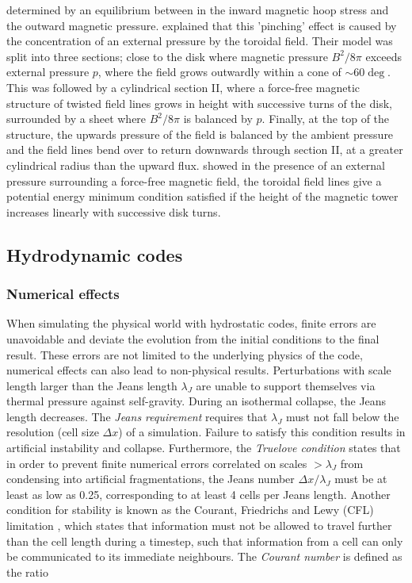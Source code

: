 \documentclass[11pt]{article}
\begin{document}
determined by an equilibrium between in the inward magnetic hoop stress and the outward magnetic pressure. \cite{Lynden-Bell1996} explained that this 'pinching' effect is caused by the concentration of an external pressure by the toroidal field. Their model was split into three sections; close to the disk where magnetic pressure $B^{2}/8\pi$ exceeds external pressure $p$, where the field grows outwardly within a cone of $\sim 60\deg$. This was followed by a cylindrical section II, where a force-free magnetic structure of twisted field lines  grows in height with successive turns of the disk, surrounded by a sheet where $B^{2}/8\pi$  is balanced by $p$. Finally, at the top of the structure, the upwards pressure of the field is balanced by the ambient pressure and the field lines bend over to return downwards through section II, at a greater cylindrical radius than the upward flux. \cite{Lynden-Bell2003}  showed in the presence of an external pressure surrounding a force-free magnetic field, the toroidal field lines give a potential energy minimum condition satisfied if the height of the magnetic tower increases linearly with successive disk turns. 

\subsection{Hydrodynamic codes}
\subsubsection{Numerical effects}
\label{sub:numerical}
When simulating the physical world with hydrostatic codes, finite errors are unavoidable and deviate the evolution from the initial conditions to the final result. These errors are not limited to the underlying physics of the code, numerical effects can also lead to non-physical results. Perturbations with scale length larger than the Jeans length $\lambda_{J}$ are unable to support themselves via thermal pressure against self-gravity. During an isothermal collapse, the Jeans length decreases. The \emph{Jeans requirement} requires that $\lambda_{J}$ must not fall below the resolution (cell size $\Delta x$) of a simulation. Failure to satisfy this condition results in artificial instability and collapse. Furthermore, the \emph{Truelove condition} \citep{Truelove1997} states that in order to prevent finite numerical errors correlated on scales $>\lambda_{J}$ from condensing into artificial fragmentations, the Jeans number $\Delta x/\lambda_{J}$ must be at least as low as 0.25, corresponding to at least 4 cells per Jeans length. Another condition for stability is known as the Courant, Friedrichs and Lewy (CFL) limitation \citep{Courant1952}, which states that information must not be allowed to travel further than the cell length during a timestep, such that information from a cell can only be communicated to its immediate neighbours. The \emph{Courant number} is defined as the ratio \citep[p.~70]{LeVeque2002}
\end{document}
